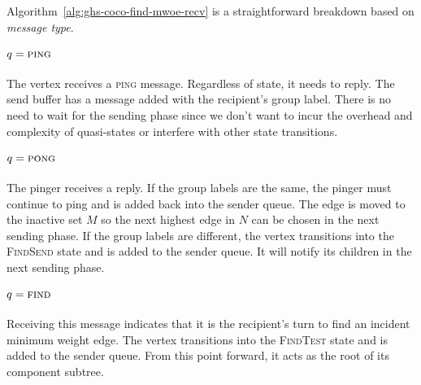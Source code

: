 \documentclass[11pt,epsf]{article}
\begin{document}
{{{\begin{algorithm}
\begin{algorithmic}
{{{                }\ENDIF
              }\ENDIF
            }\ENDFOR
        \end{algorithmic}
      \end{algorithm}
      Algorithm~\ref{alg:ghs-coco-find-mwoe-recv} is a straightforward breakdown based on \emph{message type}.
    }
    \paragraph{$q = \textsc{ping}$}{
      The vertex receives a \textsc{ping} message. Regardless of state, it needs to reply.
      The send buffer has a message added with the recipient's group label. There is no need to
      wait for the sending phase since we don't want to incur the overhead and complexity of
      quasi-states or interfere with other state transitions.
    }
    \paragraph{$q = \textsc{pong}$}{
      The pinger receives a reply. If the group labels are the same, the pinger must continue
      to ping and is added back into the sender queue. The edge is moved to the inactive set $M$
      so the next highest edge in $N$ can be chosen in the next sending phase. If the group
      labels are different, the vertex transitions into the \textsc{FindSend} state and is added to
      the sender queue. It will notify its children in the next sending phase.
    }
    \paragraph{$q = \textsc{find}$}{
      Receiving this message indicates that it is the recipient's turn to find an incident minimum
      weight edge. The vertex transitions into the \textsc{FindTest} state and is added to the sender queue.
      From this point forward, it acts as the root of its component subtree.
    }
}}
\end{document}
